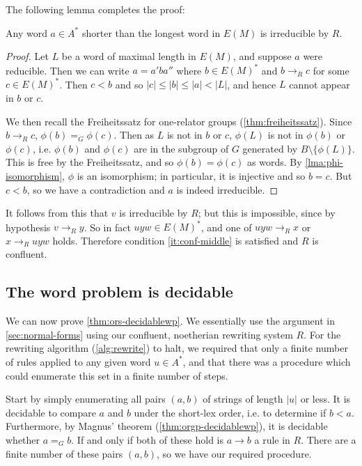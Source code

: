 \documentclass[noindex,noinsetproof,emphthm,12pt]{lmaths}
\begin{document}
The following lemma completes the proof:

\begin{lemma} \label{lma:shorter-irreducible}
	Any word $a \in A^*$ shorter than the longest word in $E(M)$ is irreducible by $R$.
\end{lemma}
\begin{proof}
	Let $L$ be a word of maximal length in $E(M)$, and suppose $a$ were reducible. Then we can write $a = a'ba''$ where $b \in E(M)^*$ and $b \to_R c$ for some $c \in E(M)^*$. Then $c < b$ and so $|c| \le |b| \le |a| < |L|$, and hence $L$ cannot appear in $b$ or $c$.
	
	We then recall the Freiheitssatz for one-relator groups (\cref{thm:freiheitssatz}).	Since $b \to_R c$, $\phi(b) =_G \phi(c)$. Then as $L$ is not in $b$ or $c$, $\phi(L)$ is not in $\phi(b)$ or $\phi(c)$, i.e. $\phi(b)$ and $\phi(c)$ are in the subgroup of $G$ generated by $B \setminus \{\phi(L)\}$. This is free by the Freiheitssatz, and so $\phi(b) = \phi(c)$ as words. By \cref{lma:phi-isomorphism}, $\phi$ is an isomorphism; in particular, it is injective and so $b = c$. But $c < b$, so we have a contradiction and $a$ is indeed irreducible.
\end{proof}

It follows from this that $v$ is irreducible by $R$; but this is impossible, since by hypothesis $v \to_R y$. So in fact $uyw \in E(M)^*$, and one of $uyw \to_R x$ or $x \to_R uyw$ holds. Therefore condition \ref{it:conf-middle} is satisfied and $R$ is confluent.


\subsection{The word problem is decidable}

We can now prove \cref{thm:ors-decidablewp}. We essentially use the argument in \cref{sec:normal-forms} using our confluent, noetherian rewriting system $R$. For the rewriting algorithm (\cref{alg:rewrite}) to halt, we required that only a finite number of rules applied to any given word $u \in A^*$, and that there was a procedure which could enumerate this set in a finite number of steps.

Start by simply enumerating all pairs $(a, b)$ of strings of length $|u|$ or less. It is decidable to compare $a$ and $b$ under the short-lex order, i.e. to determine if $b < a$. Furthermore, by Magnus' theorem (\cref{thm:orgp-decidablewp}), it is decidable whether $a =_G b$. If and only if both of these hold is $a \to b$ a rule in $R$. There are a finite number of these pairs $(a, b)$, so we have our required procedure.
\end{document}
